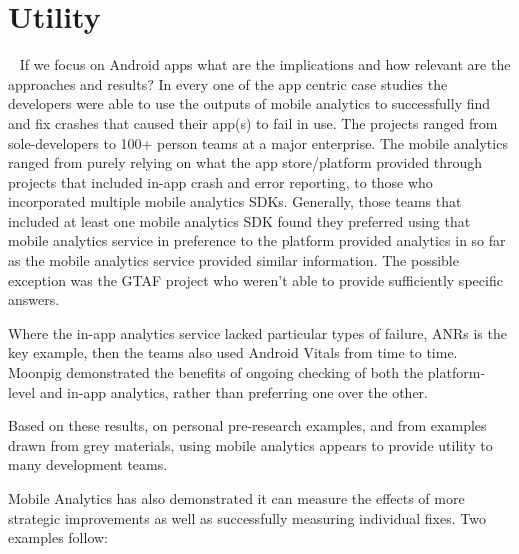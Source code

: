 \section{Utility}~\label{discussion-utility}
If we focus on Android apps what are the implications and how relevant are the approaches and results? In every one of the app centric case studies the developers were able to use the outputs of mobile analytics to successfully find and fix crashes that caused their app(s) to fail in use. The projects ranged from sole-developers to 100+ person teams at a major enterprise. The mobile analytics ranged from purely relying on what the app store/platform provided through projects that included in-app crash and error reporting, to those who incorporated multiple mobile analytics SDKs. Generally, those teams that included at least one mobile analytics SDK found they preferred using that mobile analytics service in preference to the platform provided analytics in so far as the mobile analytics service provided similar information. The possible exception was the GTAF project who weren't able to provide sufficiently specific answers. 

Where the in-app analytics service lacked particular types of failure, ANRs is the key example, then the teams also used Android Vitals from time to time. Moonpig demonstrated the benefits of ongoing checking of both the platform-level and in-app analytics, rather than preferring one over the other.

Based on these results, on personal pre-research examples, and from examples drawn from grey materials, using mobile analytics appears to provide utility to many development teams. %

Mobile Analytics has also demonstrated it can measure the effects of more strategic improvements as well as successfully measuring individual fixes. Two examples follow:
 
